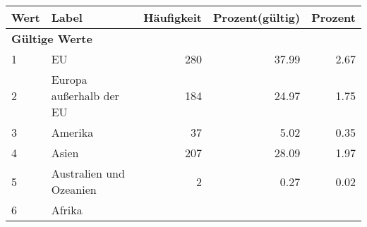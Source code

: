      \begin{longtable}{lXrrr}
     \toprule
     \textbf{Wert} & \textbf{Label} & \textbf{Häufigkeit} & \textbf{Prozent(gültig)} & \textbf{Prozent} \\
     \endhead
     \midrule
     \multicolumn{5}{l}{\textbf{Gültige Werte}}\\

     1 &
     \multicolumn{1}{X}{ EU   } &


       \num{280} &
       \num[round-mode=places,round-precision=2]{37,99} &
         \num[round-mode=places,round-precision=2]{2,67} \\

     2 &
     \multicolumn{1}{X}{ Europa außerhalb der EU   } &


       \num{184} &
       \num[round-mode=places,round-precision=2]{24,97} &
         \num[round-mode=places,round-precision=2]{1,75} \\

     3 &
     \multicolumn{1}{X}{ Amerika   } &


       \num{37} &
       \num[round-mode=places,round-precision=2]{5,02} &
         \num[round-mode=places,round-precision=2]{0,35} \\

     4 &
     \multicolumn{1}{X}{ Asien   } &


       \num{207} &
       \num[round-mode=places,round-precision=2]{28,09} &
         \num[round-mode=places,round-precision=2]{1,97} \\

     5 &
     \multicolumn{1}{X}{ Australien und Ozeanien   } &


       \num{2} &
       \num[round-mode=places,round-precision=2]{0,27} &
         \num[round-mode=places,round-precision=2]{0,02} \\

     6 &
     \multicolumn{1}{X}{ Afrika   } &



\end{longtable}
